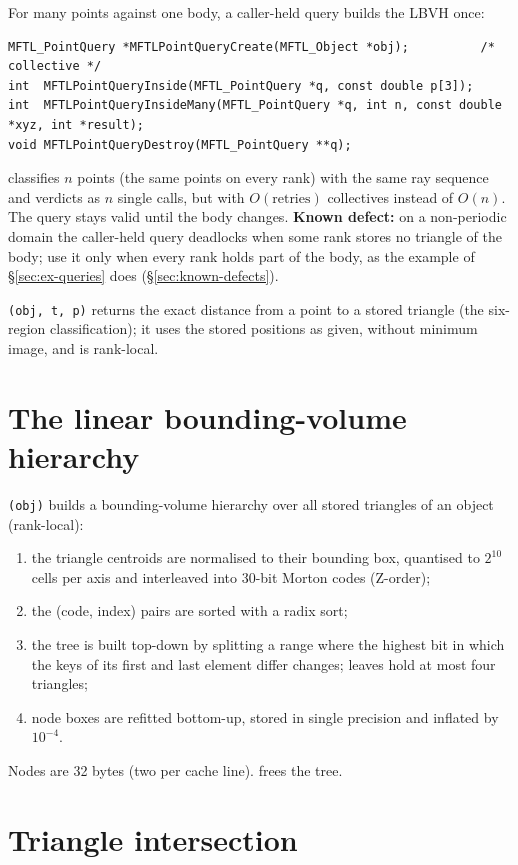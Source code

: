 For many points against one body, a caller-held query builds the LBVH once:
\begin{lstlisting}[numbers=none]
MFTL_PointQuery *MFTLPointQueryCreate(MFTL_Object *obj);          /* collective */
int  MFTLPointQueryInside(MFTL_PointQuery *q, const double p[3]);
int  MFTLPointQueryInsideMany(MFTL_PointQuery *q, int n, const double *xyz, int *result);
void MFTLPointQueryDestroy(MFTL_PointQuery **q);
\end{lstlisting}
 classifies $n$ points (the same points on every rank) with the same
ray sequence and verdicts as $n$ single calls, but with $O(\text{retries})$ collectives instead of
$O(n)$. The query stays valid until the body changes. \textbf{Known defect:} on a non-periodic
domain the caller-held query deadlocks when some rank stores no triangle of the body; use it
only when every rank holds part of the body, as the example of \S\ref{sec:ex-queries} does
(\S\ref{sec:known-defects}).

\texttt{(obj, t, p)} returns the exact distance from a point to a
stored triangle (the \mftlone{} six-region classification); it uses the stored positions as
given, without minimum image, and is rank-local.

\section{The linear bounding-volume hierarchy}

\texttt{(obj)} builds a bounding-volume hierarchy over all stored triangles
of an object (rank-local):
\begin{enumerate}
  \item the triangle centroids are normalised to their bounding box, quantised to $2^{10}$ cells
    per axis and interleaved into 30-bit Morton codes (Z-order);
  \item the (code, index) pairs are sorted with a radix sort;
  \item the tree is built top-down by splitting a range where the highest bit in which the keys
    of its first and last element differ changes; leaves hold at most four triangles;
  \item node boxes are refitted bottom-up, stored in single precision and inflated by
    $10^{-4}$.
\end{enumerate}
Nodes are 32 bytes (two per cache line).  frees the tree.

\section{Triangle intersection}
\label{sec:intersection}

